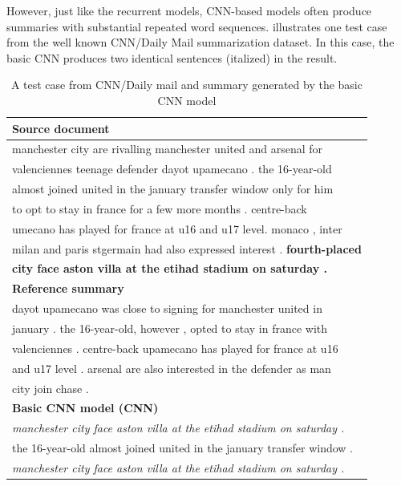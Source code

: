 However, just like the recurrent models, CNN-based models often produce
summaries with substantial repeated word sequences.
 illustrates one 
test case from the well known CNN/Daily Mail summarization dataset. 
In this case, the basic CNN produces two 
identical sentences (italized) in the result. 

\begin{table}[th]
\begin{center}
\scriptsize
\begin{tabular}{|l|}%
\hline \bf Source document \\
\hline manchester city are rivalling manchester united and arsenal for \\
       valenciennes teenage defender dayot upamecano . the 16-year-old \\
	   almost joined united in the january transfer window only for him \\
	   to opt to stay in france for a few more months . centre-back \\
	   umecano has played for france at u16 and u17 level. monaco , inter \\
	   milan and paris stgermain had also expressed interest . \textbf{fourth-placed} \\
	   \textbf{city face aston villa at the etihad stadium on saturday .} \\
\hline \bf Reference summary \\
\hline dayot upamecano was close to signing for manchester united in \\
       january . the 16-year-old, however , opted to stay in france with \\
	   valenciennes . centre-back upamecano has played for france at u16 \\
	   and u17 level . arsenal are also interested in the defender as man \\
	   city join chase . \\
\hline \bf Basic CNN model (CNN) \\
\hline \textit{manchester city face aston villa at the etihad stadium on saturday .}\\
       the 16-year-old almost joined united in the january transfer window . \\
	   \textit{manchester city face aston villa at the etihad stadium on saturday .}\\
\hline
\end{tabular}
\end{center}
\caption{\label{tab:example} A test case from CNN/Daily mail 
and summary generated by the basic CNN model}
\end{table}



